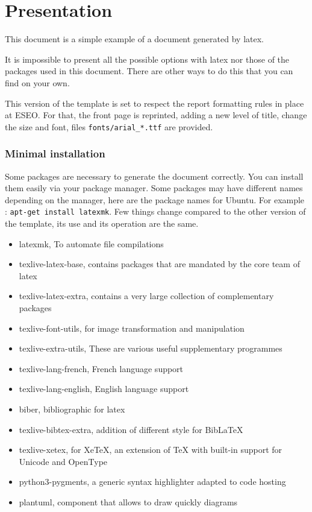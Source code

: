 \part{Presentation}
This document is a simple example of a document generated by \gls{latex}. \newline

It is impossible to present all the possible options with \gls{latex} nor those of the packages used
in this document.
There are other ways to do this that you can find on your own.\newline

This version of the template is set to respect the report formatting rules in place at ESEO.
For that, the front page is reprinted, adding a new level of title, change the size and font, files
\texttt{fonts/arial_*.ttf} are provided.\newline

\section{Minimal installation}
Some packages are necessary to generate the document correctly. You can install them easily via your
package manager. Some packages may have different names depending on the manager, here are the
package names for Ubuntu. For example : \texttt{apt-get install latexmk}.\newline
Few things change compared to the other version of the template, its use and its operation are the
same.
\begin{itemize}
    \item latexmk, To automate file compilations
    \item texlive-latex-base, contains packages that are mandated by the core team of \gls{latex}
    \item texlive-latex-extra, contains a very large collection of complementary packages
    \item texlive-font-utils, for image transformation and manipulation
    \item texlive-extra-utils, These are various useful supplementary programmes
    \item texlive-lang-french, French language support
    \item texlive-lang-english, English language support
    \item biber, bibliographic for \gls{latex}
    \item texlive-bibtex-extra, addition of different style for BibLaTeX
    \item texlive-xetex, for XeTeX, an extension of TeX with built-in support for Unicode and
          OpenType
    \item python3-pygments, a generic syntax highlighter adapted to code hosting
    \item plantuml, component that allows to draw quickly diagrams
\end{itemize}

